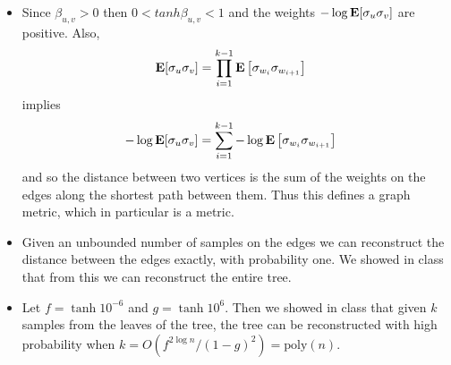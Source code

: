 \documentclass[11pt]{article} \usepackage{amssymb}
\newcommand{\E}{{\bf E}} \newcommand{\Cov}{{\bf Cov}}
\begin{document}
\begin{itemize}
\item Since $\beta_{u,v}>0$ then $0<tanh\beta_{u,v}<1$ and
  the weights $-\log\E[\sigma_u\sigma_v]$ are positive. Also,
  \begin{align*}
    \E[\sigma_u\sigma_v] &=
    \prod_{i=1}^{k-1}\E\left[\sigma_{w_i}\sigma_{w_{i+1}}\right]
  \end{align*}
  implies
  \begin{align*}
    -\log\E[\sigma_u\sigma_v] &=
    \sum_{i=1}^{k-1}-\log\E\left[\sigma_{w_i}\sigma_{w_{i+1}}\right]
  \end{align*}
  and so the distance between two vertices is the sum of the weights
  on the edges along the shortest path between them. Thus this defines
  a graph metric, which in particular is a metric.
\item Given an unbounded number of samples on the edges we can
  reconstruct the distance between the edges exactly, with probability
  one. We showed in class that from this we can reconstruct the entire
  tree.
\item Let $f=\tanh 10^{-6}$ and $g=\tanh 10^6$. Then we showed in
  class that given $k$ samples from the leaves of the tree, the tree
  can be reconstructed with high probability when $k=O(f^{2\log
    n}/(1-g)^2)=\mbox{poly}(n)$.
\end{itemize}
\end{document}
